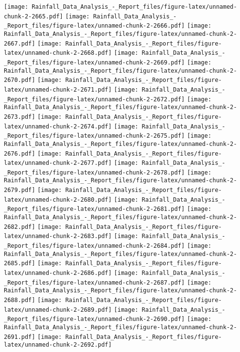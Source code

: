 \documentclass[
]{article}
\begin{document}
\texttt{[image: Rainfall\_Data\_Analysis\_-\_Report\_files/figure-latex/unnamed-chunk-2-2665.pdf]}
\texttt{[image: Rainfall\_Data\_Analysis\_-\_Report\_files/figure-latex/unnamed-chunk-2-2666.pdf]}
\texttt{[image: Rainfall\_Data\_Analysis\_-\_Report\_files/figure-latex/unnamed-chunk-2-2667.pdf]}
\texttt{[image: Rainfall\_Data\_Analysis\_-\_Report\_files/figure-latex/unnamed-chunk-2-2668.pdf]}
\texttt{[image: Rainfall\_Data\_Analysis\_-\_Report\_files/figure-latex/unnamed-chunk-2-2669.pdf]}
\texttt{[image: Rainfall\_Data\_Analysis\_-\_Report\_files/figure-latex/unnamed-chunk-2-2670.pdf]}
\texttt{[image: Rainfall\_Data\_Analysis\_-\_Report\_files/figure-latex/unnamed-chunk-2-2671.pdf]}
\texttt{[image: Rainfall\_Data\_Analysis\_-\_Report\_files/figure-latex/unnamed-chunk-2-2672.pdf]}
\texttt{[image: Rainfall\_Data\_Analysis\_-\_Report\_files/figure-latex/unnamed-chunk-2-2673.pdf]}
\texttt{[image: Rainfall\_Data\_Analysis\_-\_Report\_files/figure-latex/unnamed-chunk-2-2674.pdf]}
\texttt{[image: Rainfall\_Data\_Analysis\_-\_Report\_files/figure-latex/unnamed-chunk-2-2675.pdf]}
\texttt{[image: Rainfall\_Data\_Analysis\_-\_Report\_files/figure-latex/unnamed-chunk-2-2676.pdf]}
\texttt{[image: Rainfall\_Data\_Analysis\_-\_Report\_files/figure-latex/unnamed-chunk-2-2677.pdf]}
\texttt{[image: Rainfall\_Data\_Analysis\_-\_Report\_files/figure-latex/unnamed-chunk-2-2678.pdf]}
\texttt{[image: Rainfall\_Data\_Analysis\_-\_Report\_files/figure-latex/unnamed-chunk-2-2679.pdf]}
\texttt{[image: Rainfall\_Data\_Analysis\_-\_Report\_files/figure-latex/unnamed-chunk-2-2680.pdf]}
\texttt{[image: Rainfall\_Data\_Analysis\_-\_Report\_files/figure-latex/unnamed-chunk-2-2681.pdf]}
\texttt{[image: Rainfall\_Data\_Analysis\_-\_Report\_files/figure-latex/unnamed-chunk-2-2682.pdf]}
\texttt{[image: Rainfall\_Data\_Analysis\_-\_Report\_files/figure-latex/unnamed-chunk-2-2683.pdf]}
\texttt{[image: Rainfall\_Data\_Analysis\_-\_Report\_files/figure-latex/unnamed-chunk-2-2684.pdf]}
\texttt{[image: Rainfall\_Data\_Analysis\_-\_Report\_files/figure-latex/unnamed-chunk-2-2685.pdf]}
\texttt{[image: Rainfall\_Data\_Analysis\_-\_Report\_files/figure-latex/unnamed-chunk-2-2686.pdf]}
\texttt{[image: Rainfall\_Data\_Analysis\_-\_Report\_files/figure-latex/unnamed-chunk-2-2687.pdf]}
\texttt{[image: Rainfall\_Data\_Analysis\_-\_Report\_files/figure-latex/unnamed-chunk-2-2688.pdf]}
\texttt{[image: Rainfall\_Data\_Analysis\_-\_Report\_files/figure-latex/unnamed-chunk-2-2689.pdf]}
\texttt{[image: Rainfall\_Data\_Analysis\_-\_Report\_files/figure-latex/unnamed-chunk-2-2690.pdf]}
\texttt{[image: Rainfall\_Data\_Analysis\_-\_Report\_files/figure-latex/unnamed-chunk-2-2691.pdf]}
\texttt{[image: Rainfall\_Data\_Analysis\_-\_Report\_files/figure-latex/unnamed-chunk-2-2692.pdf]}
\end{document}
